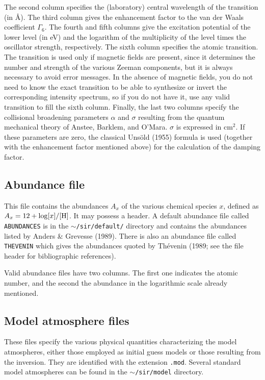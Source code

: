 \documentclass[11pt]{report}
\begin{document}
The second column specifies the (laboratory) central wavelength of the 
transition (in \AA\/). The third column gives the enhancement factor 
to the van der Waals coefficient $\Gamma_6$.  The fourth and fifth columns give
the excitation potential of the lower level (in eV) and the logarithm
of the multiplicity of the level times the oscillator strength,
respectively.  The sixth column specifies the atomic
transition. The transition is used only if magnetic fields are present,
since it determines the number and strength of the various Zeeman
components, but it is always necessary to avoid error messages. In the
absence of magnetic fields, you do not need to know the exact
transition to be able to synthesize or invert the corresponding
intensity spectrum, so if you do not have it, use any valid transition
to fill the sixth column. Finally, the last two columns specify the 
collisional broadening parameters $\alpha$ and $\sigma$ resulting
from the quantum mechanical theory of Anstee, Barklem, and O'Mara. 
$\sigma$ is expressed in cm$^2$. If these parameters are zero, 
the classical Uns\"old (1955) formula is used (together with the
enhancement factor mentioned above) for the calculation of the 
damping factor. 

\subsection{Abundance file}
This file contains the abundances $A_x$ of the various chemical 
species $x$, defined as $A_x = 12 + \log [x]/[{\rm H}]$. It may 
possess a header. A default abundance file called {\tt ABUNDANCES} 
is in the {\tt $\sim$/sir/default/} directory and contains the 
abundances listed by Anders \& Grevesse (1989). There is also an 
abundance file called {\tt THEVENIN} which gives the abundances 
quoted by Th\'evenin (1989; see the file header for 
bibliographic references).

Valid abundance files have two columns. The first one indicates 
the atomic number, and the second the abundance in the logarithmic 
scale already mentioned.

\subsection{Model atmosphere files}
\label{modelo}
These files specify the various physical quantities characterizing 
the model atmospheres, either those employed as initial guess models 
or those resulting from the inversion. They are identified with the
extension {\tt .mod}. Several standard  model atmospheres can be 
found in the {\tt $\sim$/sir/model} directory.
\end{document}
